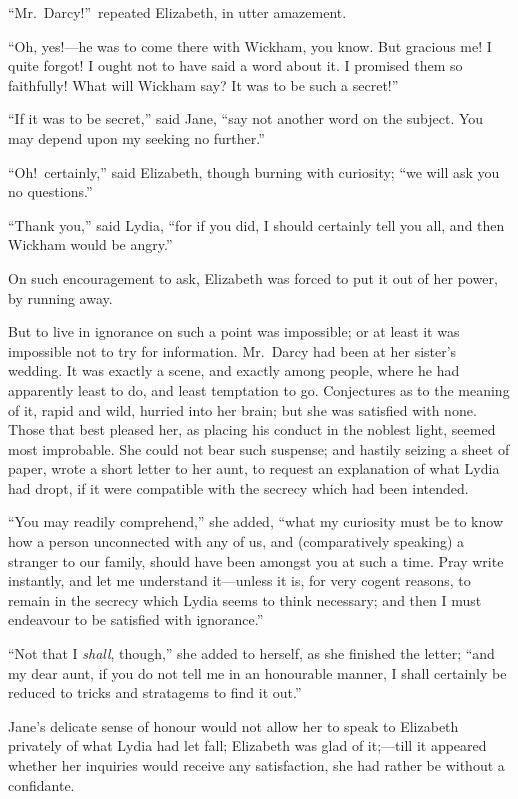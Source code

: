 \documentclass[12pt,english,oneside]{book}
\begin{document}
{}``Mr.\ Darcy!''\ repeated Elizabeth, in utter amazement.

{}``Oh, yes!\mbox{---}he was to come there with Wickham, you know.
But gracious me! I quite forgot! I ought not to have said a word about
it. I promised them so faithfully! What will Wickham say? It was to
be such a secret!''\ 

{}``If it was to be secret,'' said Jane, {}``say not another word
on the subject. You may depend upon my seeking no further.''

{}``Oh!\ certainly,'' said Elizabeth, though burning with curiosity;
{}``we will ask you no questions.''

{}``Thank you,'' said Lydia, {}``for if you did, I should certainly
tell you all, and then Wickham would be angry.''

On such encouragement to ask, Elizabeth was forced to put it out of
her power, by running away.

But to live in ignorance on such a point was impossible; or at least
it was impossible not to try for information. Mr.\ Darcy had been
at her sister's wedding. It was exactly a scene, and exactly among
people, where he had apparently least to do, and least temptation
to go. Conjectures as to the meaning of it, rapid and wild, hurried
into her brain; but she was satisfied with none. Those that best pleased
her, as placing his conduct in the noblest light, seemed most improbable.
She could not bear such suspense; and hastily seizing a sheet of paper,
wrote a short letter to her aunt, to request an explanation of what
Lydia had dropt, if it were compatible with the secrecy which had
been intended.

{}``You may readily comprehend,'' she added, {}``what my curiosity
must be to know how a person unconnected with any of us, and (comparatively
speaking) a stranger to our family, should have been amongst you at
such a time. Pray write instantly, and let me understand it\mbox{---}unless
it is, for very cogent reasons, to remain in the secrecy which Lydia
seems to think necessary; and then I must endeavour to be satisfied
with ignorance.''

{}``Not that I \textit{shall}, though,'' she added to herself, as
she finished the letter; {}``and my dear aunt, if you do not tell
me in an honourable manner, I shall certainly be reduced to tricks
and stratagems to find it out.''

Jane's delicate sense of honour would not allow her to speak to Elizabeth
privately of what Lydia had let fall; Elizabeth was glad of it;\mbox{---}till
it appeared whether her inquiries would receive any satisfaction,
she had rather be without a confidante.
\end{document}
